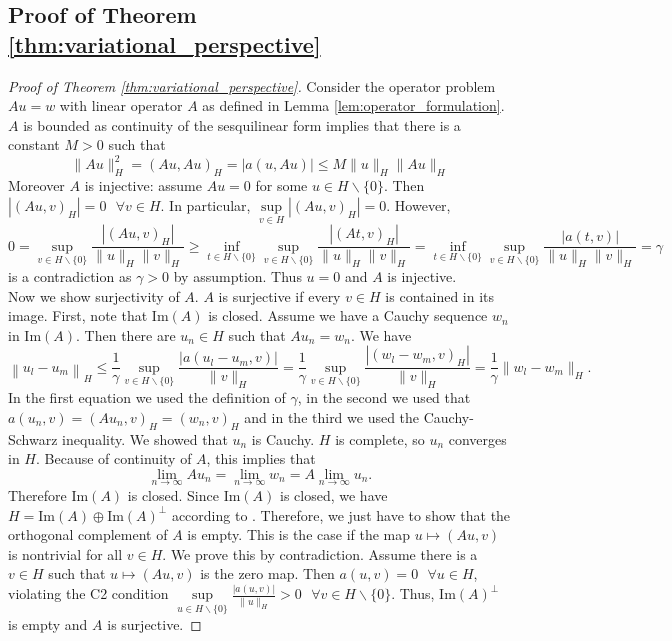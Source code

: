 \documentclass[12pt,journal,compsoc, onecolumn]{IEEEtran}
\begin{document}
\subsection{Proof of Theorem \ref{thm:variational_perspective}}
\begin{proof}[Proof of Theorem \ref{thm:variational_perspective}]
    Consider the operator problem $Au = w$ with linear operator $A$ as defined in Lemma \ref{lem:operator_formulation}.
    $A$ is bounded as continuity of the sesquilinear form implies that there is a constant $M>0$ such that
    $$
        \|A u\|_{H}^{2}=(A u, A u)_{H}=|{a(u, A u)}| \leq M\|u\|_{H}\|A u\|_{H}
    $$
    Moreover $A$ is injective: assume $Au = 0$ for some $u \in H \backslash \{0\}$. Then $|(Au, v)_H| =0 \text{ } \forall v \in H$. In particular, $\sup\limits_{v\in H} |(Au, v)_H| = 0$. However,
    $$
        0 = \sup\limits_{v\in H \backslash \{0\}} \frac{|(Au, v)_H|}{\|u\|_H \|v\|_H} \geq \inf\limits_{t \in H \backslash \{0\}}\sup\limits_{v\in H \backslash \{0\}} \frac{|(At, v)_H|}{\|u\|_H \|v\|_H} = \inf\limits_{t \in H \backslash \{0\}}\sup\limits_{v\in H \backslash \{0\}} \frac{|{a(t, v)}|}{\|u\|_H \|v\|_H}= \gamma
    $$
    is a contradiction as $\gamma > 0$ by assumption. Thus $u = 0$ and $A$ is injective. \\
    Now we show surjectivity of $A$. $A$ is surjective if every $v \in H$ is contained in its image.
    First, note that $\mathrm{Im}(A)$ is closed. Assume we have a Cauchy sequence $w_n$ in $\mathrm{Im}(A)$. Then there are $u_n \in H$ such that $Au_n = w_n$. We have
    $$
     \left\|u_{l}-u_{m}\right\|_{H} \leq \frac{1}{\gamma} \sup _{v \in H \backslash\{0\}} \frac{|a(u_l - u_m,v)|}{\|v\|_H} = 
    \frac{1}{\gamma} \sup_{v \in H \backslash\{0\}} \frac{|(w_l - w_m, v)_H|}{\|v\|_H} =  \frac{1}{\gamma}\|w_l - w_m\|_{H}.
    $$
    In the first equation we used the definition of $\gamma$, in the second we used that $a(u_n,v) = (Au_n, v)_H = (w_n, v)_H$  and in the third we used the Cauchy-Schwarz inequality. We showed that $u_n$ is Cauchy. $H$ is complete, so $u_n$ converges in $H$. Because of continuity of $A$, this implies that $$\lim\limits_{n\rightarrow \infty} Au_n = \lim\limits_{n\rightarrow \infty} w_n = A \lim\limits_{n \rightarrow \infty} u_n.$$ Therefore $\mathrm{Im}(A)$  is closed. 
    Since $\mathrm{Im}(A)$ is closed, we have $H = \mathrm{Im}(A) \oplus \mathrm{Im}(A)^\perp$ according to \cite{rudin1991functional}. Therefore, we just have to show that the orthogonal complement of $A$ is empty. This is the case if the map $u \mapsto (Au, v)$ is nontrivial for all $v \in H$. We prove this by contradiction. Assume there is a $v \in H$ such that $u \mapsto (Au, v)$ is the zero map. Then   $a(u, v) = 0  \text{ }\forall u \in H$, violating the C2 condition $\sup\limits_{u \in H \backslash\{0\}} \frac{|a(u, v)|}{\|u\|_{H}}>0 \text{ } \forall v \in H \backslash\{0\}$. Thus, $\mathrm{Im}(A)^\perp$ is empty and $A$ is surjective.

\end{proof}
\end{document}
